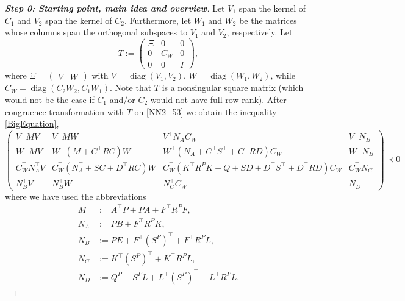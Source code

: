 \documentclass[11pt,a4paper,oneside,DIV=12,headings=small]{scrartcl}
\newcommand{\diag}{\operatorname{diag}}
\theoremstyle{plain}
\newcounter{MYtempeqncnt}
\begin{document}
\begin{proof}[\textbf{Step 0: \emph{Starting point, main idea and overview}}]
Let $V_1$ span the kernel of $C_1$ and $V_2$ span the kernel of $C_2$. Furthermore, let $W_1$ and $W_2$ be the matrices whose columns span the orthogonal subspaces to $V_1$ and $V_2$, respectively. Let 
\begin{equation}
\label{newT_53}
T:=\begin{pmatrix} \Xi & 0 & 0 \\ 0  & C_W & 0 \\   0 & 0 & I  \end{pmatrix} ,
\end{equation}
where $\Xi=\begin{pmatrix} V & W \end{pmatrix}$ with $V=\diag(V_1,V_2)$, $W=\diag(W_1,W_2)$, while $C_W=\diag(C_2W_2,C_1W_1)$.
Note that $T$ is a nonsingular square matrix (which would not be the case if $C_1$ and/or $C_2$ would not have full row rank). 
After congruence transformation with $T$ on \eqref{NN2_53} we obtain the inequality \eqref{BigEquation}, 
\begin{equation}
\label{BigEquation}
\begin{pmatrix}
V^\top M V & V^\top M W & V^\top N_A C_W & V^\top N_B \\
W^\top M V & W^\top(M+C^\top R C)W & W^\top(N_A+C^\top S^\top + C^\top R D)C_W & W^\top N_B\\
C_W^\top N_A^\top V & C_W^\top (N_A^\top+SC+D^\top RC)W & C_W^\top (K^\top R^P K + Q+SD+D^\top S^\top + D^\top R D) C_W & C_W^\top N_C \\
N_B^\top V & N_B^\top W & N_C^\top C_W & N_D
\end{pmatrix} \prec 0
\end{equation}
where we have used the abbreviations
\begin{align}
M&:=A^\top P+PA+F^\top R^P F, \label{labelM} \\
N_A&:=PB+F^\top R^P K, \\
N_B&:=PE+F^\top(S^P)^\top+F^\top R^P L, \\
N_C&:=K^\top (S^P)^\top+K^\top R^P L, \\
N_D&:=Q^P+S^PL+L^\top (S^P)^\top +L^\top R^P L.
\end{align}
\normalsize


\end{proof}
\end{document}
